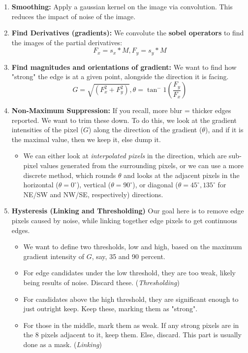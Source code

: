 \documentclass{article}
\begin{document}
\begin{enumerate}
    \item \textbf{Smoothing:} Apply a gaussian kernel on the image via convolution. This reduces the impact of noise of the image. 
    \item \textbf{Find Derivatives (gradients):} We convolute the \textbf{sobel operators} to find the images of the partial derivatives:
    $$F_x = s_x * M, F_y = s_y * M$$
    \item \textbf{Find magnitudes and orientations of gradient:} We want to find how "strong" the edge is at a given point, alongside the direction it is facing. 
    $$G = \sqrt{(F_x^2 + F_y^2)}, \theta = \tan^-1(\frac{F_y}{F_x})$$
    \item \textbf{Non-Maximum Suppression:} If you recall, more blur = thicker edges reported. We want to trim these down. To do this, we look at the gradient intensities of the pixel ($G$) along the direction of the gradient ($\theta$), and if it is the maximal value, then we keep it, else dump it. 
    \begin{itemize}
        \item We can either look at \textit{interpolated pixels} in the direction, which are sub-pixel values generated from the surrounding pixels, or we can use a more discrete method, which rounds $\theta$ and looks at the adjacent pixels in the horizontal ($\theta = 0^{\circ}$), vertical ($\theta = 90^{\circ}$), or diagonal ($\theta = 45^{\circ}, 135^{\circ}$ for NE/SW and NW/SE, respectively) directions. 
    \end{itemize}
    \item \textbf{Hysteresis (Linking and Thresholding)} Our goal here is to remove edge pixels caused by noise, while linking together edge pixels to get continuous edges.
    \begin{itemize}
        \item We want to define two thresholds, low and high, based on the maximum gradient intensity of $G$, say, 35 and 90 percent.
        \item For edge candidates under the low threshold, they are too weak, likely being results of noise. Discard these. (\textit{Thresholding})
        \item For candidates above the high threshold, they are significant enough to just outright keep. Keep these, marking them as "strong".
        \item For those in the middle, mark them as weak. If any strong pixels are in the 8 pixels adjacent to it, keep them. Else, discard. This part is usually done as a mask. (\textit{Linking})
    \end{itemize}

\end{enumerate}
\end{document}
